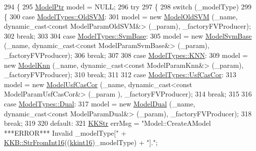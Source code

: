 \begin{DoxyCode}
294 \{
295   \hyperlink{class_k_k_m_l_l_1_1_model}{ModelPtr}  model = NULL;
296   \textcolor{keywordflow}{try}
297   \{
298     \textcolor{keywordflow}{switch}  (\_modelType)
299     \{
300     \textcolor{keywordflow}{case}  \hyperlink{class_k_k_m_l_l_1_1_model_aeda4060e088c67446ca993eefcecea06a7a3ee72cc2709227d58fd2c189a2a58b}{ModelTypes::OldSVM}:    
301           model = \textcolor{keyword}{new} \hyperlink{class_k_k_m_l_l_1_1_model_old_s_v_m}{ModelOldSVM}    (\_name, dynamic\_cast<const ModelParamOldSVM&>    (\_param), 
      \_factoryFVProducer);
302           \textcolor{keywordflow}{break};
303 
304     \textcolor{keywordflow}{case}  \hyperlink{class_k_k_m_l_l_1_1_model_aeda4060e088c67446ca993eefcecea06ac59ef2743d310cad5d7bbb7b53773bb4}{ModelTypes::SvmBase}:
305           model = \textcolor{keyword}{new} \hyperlink{class_k_k_m_l_l_1_1_model_svm_base}{ModelSvmBase}   (\_name, dynamic\_cast<const ModelParamSvmBase&>   (\_param),
       \_factoryFVProducer);
306           \textcolor{keywordflow}{break};
307 
308     \textcolor{keywordflow}{case}  \hyperlink{class_k_k_m_l_l_1_1_model_aeda4060e088c67446ca993eefcecea06ab602e23c0ec2466f3aa6cade0cd5ce05}{ModelTypes::KNN}:
309           model = \textcolor{keyword}{new} \hyperlink{class_k_k_m_l_l_1_1_model_knn}{ModelKnn}       (\_name, dynamic\_cast<const ModelParamKnn&>       (\_param), 
      \_factoryFVProducer);
310           \textcolor{keywordflow}{break};
311 
312     \textcolor{keywordflow}{case}  \hyperlink{class_k_k_m_l_l_1_1_model_aeda4060e088c67446ca993eefcecea06ade699dc1790347a08d7060ab8078c71c}{ModelTypes::UsfCasCor}:
313           model = \textcolor{keyword}{new} \hyperlink{class_k_k_m_l_l_1_1_model_usf_cas_cor}{ModelUsfCasCor} (\_name, dynamic\_cast<const ModelParamUsfCasCor&> (\_param
      ), \_factoryFVProducer);
314           \textcolor{keywordflow}{break};
315 
316     \textcolor{keywordflow}{case}  \hyperlink{class_k_k_m_l_l_1_1_model_aeda4060e088c67446ca993eefcecea06acf53591af1208ddd535806600273099a}{ModelTypes::Dual}:
317           model = \textcolor{keyword}{new} \hyperlink{class_k_k_m_l_l_1_1_model_dual}{ModelDual}      (\_name, dynamic\_cast<const ModelParamDual&>      (\_param), 
      \_factoryFVProducer);
318           \textcolor{keywordflow}{break};
319 
320     \textcolor{keywordflow}{default}:
321           \hyperlink{class_k_k_b_1_1_k_k_str}{KKStr} errMsg = \textcolor{stringliteral}{"Model::CreateAModel   ***ERROR***  Invalid \_modelType["} + 
      \hyperlink{namespace_k_k_b_a197206fb786776e54355a462b6181aac}{KKB::StrFromInt16}((\hyperlink{namespace_k_k_b_a93809780ee294124dda4c23069f41248}{kkint16})\_modelType) + \textcolor{stringliteral}{"]."};

\end{DoxyCode}
